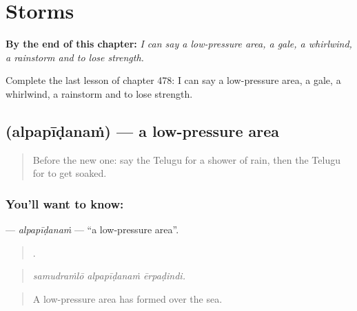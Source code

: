 
\chapter{Storms}
\label{ch:te-storms}

\begin{chapteropening}
\textbf{By the end of this chapter:} \emph{I can say a low-pressure area, a gale, a whirlwind, a rainstorm and to lose strength.}

Complete the last lesson of chapter 478: I can say a low-pressure area, a gale, a whirlwind, a rainstorm and to lose strength.
\end{chapteropening}

\section[\texorpdfstring{\te{అల్పపీడనం} (alpapīḍanaṁ)}{అల్పపీడనం (alpapīḍanaṁ)}]{ (alpapīḍanaṁ) — a low-pressure area}

\label{lesson:TE-C478-alpapidanam}



\begin{quote}
Before the new one: say the Telugu for a shower of rain, then the Telugu for to get soaked.
\end{quote}

\subsection*{You'll want to know: }
\textbf{} — \emph{alpapīḍanaṁ} — \textquotedblleft{}a low-pressure area\textquotedblright{}.

\begin{quote}
  .
\end{quote}

\begin{quote}
\emph{samudraṁlō alpapīḍanaṁ ērpaḍindi.}
\end{quote}

\begin{quote}
A low-pressure area has formed over the sea.
\end{quote}


